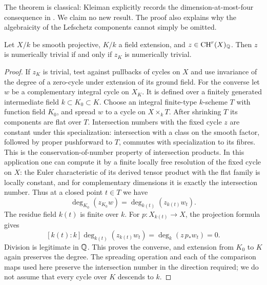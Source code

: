 The theorem is classical: Kleiman explicitly records the dimension-at-most-four
consequence in \cite[\S3.10, following Propositions 3.6 and 3.8 and Corollary
3.9]{BKleiman1968}. We claim no new result. The proof also explains why the
algebraicity of the Lefschetz components cannot simply be omitted.

\begin{lemma}\label{lem:B-basechange-num}
Let $X/k$ be smooth projective, $K/k$ a field extension, and
$z\in\mathrm{CH}^r(X)_{{\mathbb{Q}}}$. Then $z$ is numerically trivial if and only if
$z_K$ is numerically trivial.
\end{lemma}
\begin{proof}
If $z_K$ is trivial, test against pullbacks of cycles on $X$ and use invariance
of the degree of a zero-cycle under extension of its ground field.
For the converse let $w$ be a complementary integral cycle on $X_K$.
It is defined over a finitely generated intermediate field $k\subset K_0\subset K$.
Choose an integral finite-type $k$-scheme $T$ with function field $K_0$,
and spread $w$ to a cycle on $X\times_k T$. After shrinking $T$ its
components are flat over $T$. Intersection numbers with the fixed cycle
$z$ are constant under this specialization: intersection with a class on
the smooth factor, followed by proper pushforward to $T$, commutes with
specialization to its fibres. This is the conservation-of-number property
of intersection products. In this application one can compute it by a
finite locally free resolution of the fixed cycle on $X$: the Euler
characteristic of its derived tensor product with the flat family is
locally constant, and for complementary dimensions it is exactly the
intersection number. Thus at a closed point $t\in T$ we have
\[
 \deg_{K_0}(z_{K_0}w)=\deg_{k(t)}(z_{k(t)}w_t).
\]
The residue field $k(t)$ is finite over $k$. For
$p:X_{k(t)}\to X$, the projection formula gives
\[
 [k(t):k]\deg_{k(t)}(z_{k(t)}w_t)
     =\deg_k(z\,p_*w_t)=0.
\]
Division is legitimate in ${\mathbb{Q}}$. This proves the converse, and extension
from $K_0$ to $K$ again preserves the degree. The spreading operation and
each of the comparison maps used here preserve the intersection number
in the direction required; we do not assume that every cycle over $K$
descends to $k$.
\end{proof}

